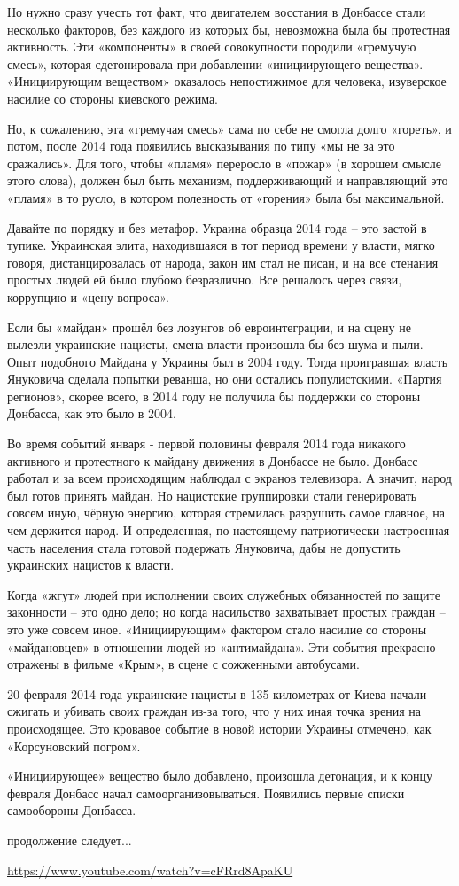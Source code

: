 Но нужно сразу учесть тот факт, что двигателем восстания в Донбассе стали
несколько факторов, без каждого из которых бы, невозможна была бы протестная
активность. Эти «компоненты» в своей совокупности породили «гремучую смесь»,
которая сдетонировала при добавлении «инициирующего вещества». «Инициирующим
веществом» оказалось непостижимое для человека, изуверское насилие со стороны
киевского режима.

Но, к сожалению, эта «гремучая смесь» сама по себе не смогла долго «гореть», и
потом, после 2014 года появились высказывания по типу «мы не за это сражались».
Для того, чтобы «пламя» переросло в «пожар» (в хорошем смысле этого слова),
должен был быть механизм, поддерживающий и направляющий это «пламя» в то русло,
в котором полезность от «горения» была бы максимальной.

Давайте по порядку и без метафор. Украина образца 2014 года – это застой в
тупике. Украинская элита, находившаяся в тот период времени у власти, мягко
говоря, дистанцировалась от народа, закон им стал не писан, и на все стенания
простых людей ей было глубоко безразлично. Все решалось через связи, коррупцию
и «цену вопроса».

Если бы «майдан» прошёл без лозунгов об евроинтеграции, и на сцену не вылезли
украинские нацисты, смена власти произошла бы без шума и пыли. Опыт подобного
Майдана у Украины был в 2004 году. Тогда проигравшая власть Януковича сделала
попытки реванша, но они остались популистскими. «Партия регионов», скорее
всего, в 2014 году не получила бы поддержки со стороны Донбасса, как это было в
2004.

Во время событий января - первой половины февраля 2014 года никакого активного
и протестного к майдану движения в Донбассе не было. Донбасс работал и за всем
происходящим наблюдал с экранов телевизора. А значит, народ был готов принять
майдан. Но нацистские группировки стали генерировать совсем иную, чёрную
энергию, которая стремилась разрушить самое главное, на чем держится народ. И
определенная, по-настоящему патриотически настроенная часть населения стала
готовой подержать Януковича, дабы не допустить украинских нацистов к власти.

Когда «жгут» людей при исполнении своих служебных обязанностей по защите
законности – это одно дело; но когда насильство захватывает простых граждан –
это уже совсем иное. «Инициирующим» фактором стало насилие со стороны
«майдановцев» в отношении людей из «антимайдана». Эти события прекрасно
отражены в фильме «Крым», в сцене с сожженными автобусами.

20 февраля 2014 года украинские нацисты в 135 километрах от Киева начали
сжигать и убивать своих граждан из-за того, что у них иная точка зрения на
происходящее. Это кровавое событие в новой истории Украины отмечено, как
«Корсуновский погром».

«Инициирующее» вещество было добавлено, произошла детонация, и к концу февраля
Донбасс начал самоорганизовываться. Появились первые списки самообороны
Донбасса.

продолжение следует...

\url{https://www.youtube.com/watch?v=cFRrd8ApaKU}

